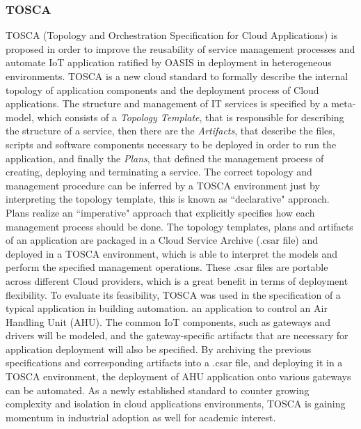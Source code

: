 \subsubsection{TOSCA}
\label{subs:tosca}
TOSCA (Topology and Orchestration Specification for Cloud Applications) \cite{li2013towards} is
proposed in order to improve the reusability of service management processes and automate IoT application
ratified by OASIS in deployment in heterogeneous environments. TOSCA is a new cloud standard to formally
describe the internal topology of application components and the deployment process of Cloud applications.
The structure and management of IT services is specified by a meta-model, which consists of
a \textit{Topology Template}, that is responsible for describing the structure of a service, then there
are the \textit{Artifacts}, that describe the files, scripts and software components necessary to be
deployed in order to run the application, and finally the \textit{Plans}, that defined the management process
of creating, deploying and terminating a service. The correct topology and management procedure can be inferred
by a TOSCA environment just by interpreting the topology template, this is known as ``declarative" approach.
Plans realize an ``imperative" approach that explicitly specifies how each management process should be done.
The topology templates, plans and artifacts of an application are packaged in a Cloud Service Archive (.csar file)
and deployed in a TOSCA environment, which is able to interpret the models and perform the specified management
operations. These .csar files are portable across different Cloud providers, which is a great benefit in terms
of deployment flexibility. To evaluate its feasibility, TOSCA was used in the specification of a typical
application in building automation. an application to control an Air Handling Unit (AHU). The common IoT
components, such as gateways and drivers will be modeled, and the gateway-specific artifacts that are
necessary for application deployment will also be specified. By archiving the previous specifications
and corresponding artifacts into a .csar file, and deploying it in a TOSCA environment, the deployment
of AHU application onto various gateways can be automated. As a newly established standard to counter
growing complexity and isolation in cloud applications environments, TOSCA is gaining momentum in industrial
adoption as well for academic interest.
